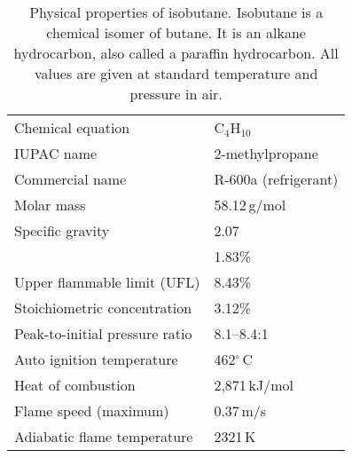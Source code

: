 \begin{table}
\begin{center}
\begin{tabular}{p{}|p{}} 
\raggedleft Chemical equation&C$_4$H$_{10}$\\
\raggedleft IUPAC name&2-methylpropane\\
\raggedleft Commercial name&R-600a (refrigerant)\\
\raggedleft Molar mass&58.12\,g/mol\\
\raggedleft Specific gravity&2.07\\
\raggedleft {Lower flammable limit (LFL)}%
& {1.83\%}\\
\raggedleft Upper flammable limit (UFL)&8.43\%\\
\raggedleft Stoichiometric concentration %
&3.12\% \\
\raggedleft Peak-to-initial pressure ratio %
&8.1--8.4:1\\%
\raggedleft Auto ignition temperature%
&462$^\circ$\,C\\
\raggedleft Heat of combustion%
&%
2,871\,kJ/mol%
\\
\raggedleft Flame speed (maximum)&0.37\,m/s\\
\raggedleft Adiabatic flame temperature&%
2321\,K\\
\end{tabular}\\
\end{center}

\caption{ Physical properties of isobutane.  Isobutane is a chemical isomer of butane.  It is an alkane hydrocarbon, also called a paraffin hydrocarbon. %
All values are given at standard temperature and pressure in air.}
\label{isobutane}
\end{table}

